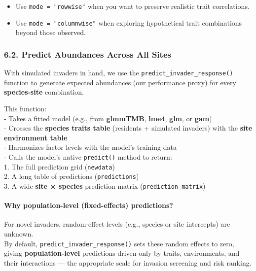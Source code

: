 \documentclass[
]{article}
\providecommand{\tightlist}{%
  \setlength{\itemsep}{0pt}\setlength{\parskip}{0pt}}
\begin{document}
\begin{itemize}
\tightlist
\item
  Use \texttt{mode\ =\ "rowwise"} when you want to preserve realistic
  trait correlations.
\item
  Use \texttt{mode\ =\ "columnwise"} when exploring hypothetical trait
  combinations beyond those observed.
\end{itemize}

\hypertarget{predict-abundances-across-all-sites}{%
\subsubsection{6.2. Predict Abundances Across All
Sites}\label{predict-abundances-across-all-sites}}

With simulated invaders in hand, we use the
\texttt{predict\_invader\_response()} function to generate expected
abundances (our performance proxy) for every \textbf{species-site}
combination.

This function:\\
- Takes a fitted model (e.g., from \textbf{glmmTMB}, \textbf{lme4},
\textbf{glm}, or \textbf{gam})\\
- Crosses the \textbf{species traits table} (residents + simulated
invaders) with the \textbf{site environment table}\\
- Harmonizes factor levels with the model's training data\\
- Calls the model's native \texttt{predict()} method to return:\\
1. The full prediction grid (\texttt{newdata})\\
2. A long table of predictions (\texttt{predictions})\\
3. A wide \textbf{site × species} prediction matrix
(\texttt{prediction\_matrix})

\hypertarget{why-population-level-fixed-effects-predictions}{%
\paragraph{Why population-level (fixed-effects)
predictions?}\label{why-population-level-fixed-effects-predictions}}

For novel invaders, random-effect levels (e.g., species or site
intercepts) are unknown.\\
By default, \texttt{predict\_invader\_response()} sets these random
effects to zero, giving \textbf{population-level} predictions driven
only by traits, environments, and their interactions --- the appropriate
scale for invasion screening and risk ranking.
\end{document}
